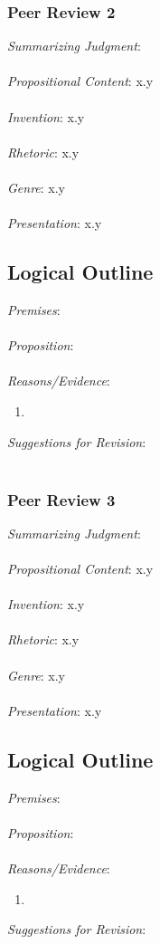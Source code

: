 \documentclass[12pt]{article}
\begin{document}
\subsubsection*{Peer Review 2}
\noindent \textit{Summarizing Judgment}: \\ \\
\textit{Propositional Content}: x.y \\ \\ %
\textit{Invention}: x.y \\ \\
\textit{Rhetoric}: x.y \\ \\
\textit{Genre}: x.y \\ \\
\textit{Presentation}: x.y
\subsection*{Logical Outline}
\noindent \textit{Premises}: \\ \\
\textit{Proposition}: \\ \\
\textit{Reasons/Evidence}:
\begin{enumerate}
	\item \ %
\end{enumerate}
\textit{Suggestions for Revision}: \\\\


\subsubsection*{Peer Review 3}
\noindent \textit{Summarizing Judgment}: \\ \\
\textit{Propositional Content}: x.y \\ \\ %
\textit{Invention}: x.y \\ \\
\textit{Rhetoric}: x.y \\ \\
\textit{Genre}: x.y \\ \\
\textit{Presentation}: x.y
\subsection*{Logical Outline}
\noindent \textit{Premises}: \\ \\
\textit{Proposition}: \\ \\
\textit{Reasons/Evidence}:
\begin{enumerate}
	\item \ %
\end{enumerate}
\textit{Suggestions for Revision}: \\\\
\end{document}
